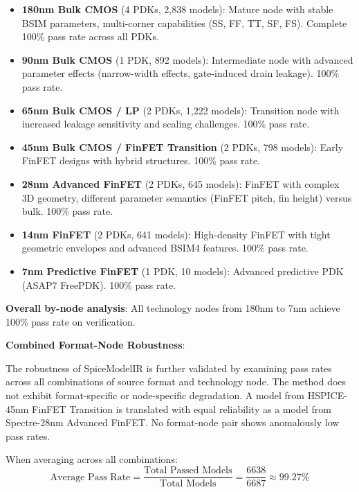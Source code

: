 \documentclass[conference]{IEEEtran}
\begin{document}
\begin{itemize}
\item \textbf{180nm Bulk CMOS} (4 PDKs, 2,838 models): Mature node with stable BSIM parameters, multi-corner capabilities (SS, FF, TT, SF, FS). Complete 100\% pass rate across all PDKs.

\item \textbf{90nm Bulk CMOS} (1 PDK, 892 models): Intermediate node with advanced parameter effects (narrow-width effects, gate-induced drain leakage). 100\% pass rate.

\item \textbf{65nm Bulk CMOS / LP} (2 PDKs, 1,222 models): Transition node with increased leakage sensitivity and scaling challenges. 100\% pass rate.

\item \textbf{45nm Bulk CMOS / FinFET Transition} (2 PDKs, 798 models): Early FinFET designs with hybrid structures. 100\% pass rate.

\item \textbf{28nm Advanced FinFET} (2 PDKs, 645 models): FinFET with complex 3D geometry, different parameter semantics (FinFET pitch, fin height) versus bulk. 100\% pass rate.

\item \textbf{14nm FinFET} (2 PDKs, 641 models): High-density FinFET with tight geometric envelopes and advanced BSIM4 features. 100\% pass rate.

\item \textbf{7nm Predictive FinFET} (1 PDK, 10 models): Advanced predictive PDK (ASAP7 FreePDK). 100\% pass rate.
\end{itemize}

\textbf{Overall by-node analysis}: All technology nodes from 180nm to 7nm achieve 100\% pass rate on verification.

\textbf{Combined Format-Node Robustness}:

The robustness of SpiceModelIR is further validated by examining pass rates across all combinations of source format and technology node. The method does not exhibit format-specific or node-specific degradation. A model from HSPICE-45nm FinFET Transition is translated with equal reliability as a model from Spectre-28nm Advanced FinFET. No format-node pair shows anomalously low pass rates.

When averaging across all combinations:
$$\text{Average Pass Rate} = \frac{\text{Total Passed Models}}{\text{Total Models}} = \frac{6638}{6687} \approx 99.27\%$$
\end{document}
